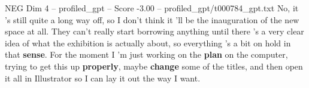 \begin{textsample}{NEG Dim 4 – profiled\_gpt – Score -3.00 – profiled\_gpt/t000784\_gpt.txt}  \label{ex:f4_neg_003}
No, it ’s still quite a long way off, so I don't think it ’ll be the inauguration of the new space at all.
They can't really start borrowing anything until there ’s a very clear idea of what the exhibition is actually about, so everything ’s a bit on hold in that \textbf{sense}.
For the moment I ’m just working on the \textbf{plan} on the computer, trying to get this up \textbf{properly}, maybe \textbf{change} some of the titles, and then open it all in Illustrator so I can lay it out the way I want.

\end{textsample}
